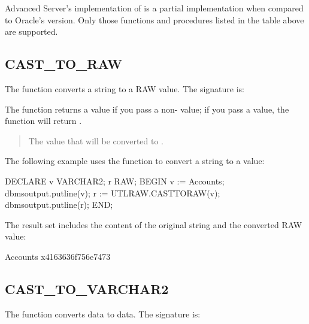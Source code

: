 \documentclass[letterpaper,10pt,english,openany,oneside]{sphinxmanual}
\begin{document}
Advanced Server’s implementation of  is a partial implementation
when compared to Oracle’s version. Only those functions and procedures
listed in the table above are supported.


\subsection{CAST\_TO\_RAW}
\label{\detokenize{utl_raw:cast-to-raw}}
The  function converts a  string to a RAW value.
The signature is:
\begin{quote}

\end{quote}

The function returns a  value if you pass a non- value; if you
pass a  value, the function will return .


\begin{quote}

The  value that will be converted to .
\end{quote}


The following example uses the  function to convert a
 string to a  value:

%
\begin{sphinxVerbatim}[commandchars=\\\{\}]
DECLARE
  v VARCHAR2;
  r RAW;
BEGIN
  v := \PYGZsq{}Accounts\PYGZsq{};
  dbms\PYGZus{}output.put\PYGZus{}line(v);
  r := UTL\PYGZus{}RAW.CAST\PYGZus{}TO\PYGZus{}RAW(v);
  dbms\PYGZus{}output.put\PYGZus{}line(r);
END;
\end{sphinxVerbatim}

The result set includes the content of the original string and the converted RAW value:

%
\begin{sphinxVerbatim}[commandchars=\\\{\}]
Accounts
\PYGZbs{}x4163636f756e7473
\end{sphinxVerbatim}


\subsection{CAST\_TO\_VARCHAR2}
\label{\detokenize{utl_raw:cast-to-varchar2}}
The  function converts  data to  data. The
signature is:
\begin{quote}

\end{quote}
\end{document}
